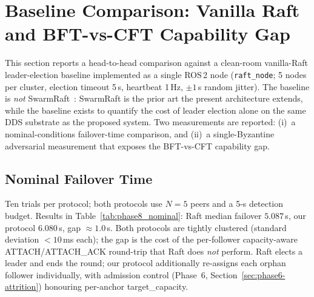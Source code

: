 \documentclass[journal,10pt,twocolumn]{IEEEtran}
\begin{document}
\section{Baseline Comparison: Vanilla Raft and BFT-vs-CFT Capability Gap}
\label{sec:baseline}

This section reports a head-to-head comparison against a clean-room vanilla-Raft leader-election baseline implemented as a single ROS\,2 node (\texttt{raft\_node}; 5 nodes per cluster, election timeout 5\,s, heartbeat 1\,Hz, $\pm 1$\,s random jitter). The baseline is \emph{not} SwarmRaft~\cite{dev2025swarmraft}: SwarmRaft is the prior art the present architecture extends, while the baseline exists to quantify the cost of leader election alone on the same DDS substrate as the proposed system. Two measurements are reported: (i)~a nominal-conditions failover-time comparison, and (ii)~a single-Byzantine adversarial measurement that exposes the BFT-vs-CFT capability gap.

\subsection{Nominal Failover Time}

Ten trials per protocol; both protocols use $N=5$ peers and a 5-s detection budget. Results in Table~\ref{tab:phase8_nominal}: Raft median failover $5.087$\,s, our protocol $6.080$\,s, gap $\approx 1.0$\,s. Both protocols are tightly clustered (standard deviation $<10$\,ms each); the gap is the cost of the per-follower capacity-aware ATTACH/ATTACH\_ACK round-trip that Raft does \emph{not} perform. Raft elects a leader and ends the round; our protocol additionally re-assigns each orphan follower individually, with admission control (Phase~6, Section~\ref{sec:phase6-attrition}) honouring per-anchor target\_capacity.

\begin{table}[t]
\centering
\caption{Phase~8 nominal-conditions comparison, ten trials per protocol at $N=5$ peers. Both protocols share the 5-s detection budget; the $\sim 1$-s gap is the additional per-follower ATTACH coordination the proposed system performs and Raft does not.}
\label{tab:phase8_nominal}
\small
{}
\end{table}
\end{document}

